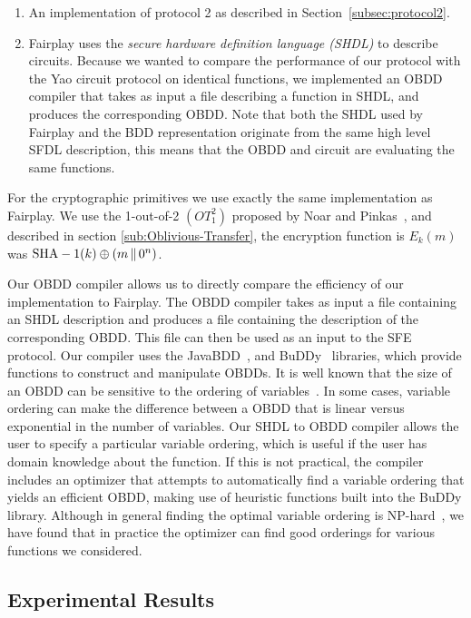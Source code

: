 \begin{enumerate}
\item An implementation of  protocol 2
as described in Section~\ref{subsec:protocol2}.

\item Fairplay uses the {\it secure hardware definition language (SHDL)} to
describe circuits. Because we wanted to compare the performance of our
protocol with the Yao circuit protocol on identical functions, 
we implemented an OBDD compiler 
that takes as input a file
describing a function in SHDL, and produces the corresponding OBDD.
Note that both the SHDL used by Fairplay and the BDD representation
originate from the same high level SFDL description, this means that
the OBDD and circuit are evaluating the same functions.
\end{enumerate}

For the cryptographic primitives we use exactly the same
implementation as Fairplay. We use the 1-out-of-2 $(OT^{2}_{1})$
proposed by Noar and Pinkas~\cite{Noar-Pinkas:2001}, and described in section
\ref{sub:Oblivious-Transfer}, the encryption
function is $E_k (m)$ was ${\rm SHA-1}(k) \oplus (m \,\|\,0^n)$.


Our OBDD compiler allows us to directly compare the efficiency of our
implementation to Fairplay. The OBDD compiler takes as input a file
containing an SHDL description and produces a file containing the
description of the corresponding OBDD. This file can then be used as
an input to the SFE protocol. Our compiler uses the
JavaBDD~\cite{JavaBDD}, and BuDDy~\cite{BuDDy} libraries, which
provide functions to construct and manipulate OBDDs. It is well known
that the size of an OBDD can be sensitive to the ordering of
variables~\cite{Bryant:BDD}. In some cases, variable ordering can make
the difference between a OBDD that is linear versus exponential in the
number of variables. Our SHDL to OBDD compiler allows the user to
specify a particular variable ordering, which is useful if the user
has domain knowledge about the function. If this is not practical, the
compiler includes an optimizer that attempts to automatically find a
variable ordering that yields an efficient OBDD, making use of
heuristic functions built into the BuDDy library. Although in general
finding the optimal variable ordering is
NP-hard~\cite{Bollig-Wegener:1996}, we have found that in practice the
optimizer can find good orderings for various functions we considered.


\subsection{Experimental Results}

